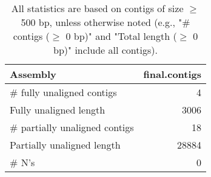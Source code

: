 \documentclass[12pt,a4paper]{article}
\begin{document}
\begin{table}[ht]
\begin{center}
\caption{All statistics are based on contigs of size $\geq$ 500 bp, unless otherwise noted (e.g., "\# contigs ($\geq$ 0 bp)" and "Total length ($\geq$ 0 bp)" include all contigs).}
\begin{tabular}{|l*{1}{|r}|}
\hline
Assembly & final.contigs \\ \hline
\# fully unaligned contigs & 4 \\ \hline
Fully unaligned length & 3006 \\ \hline
\# partially unaligned contigs & 18 \\ \hline
Partially unaligned length & 28884 \\ \hline
\# N's & 0 \\ \hline
\end{tabular}
\end{center}
\end{table}
\end{document}
